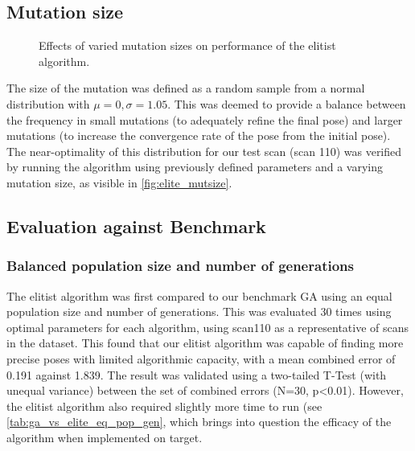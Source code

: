 \documentclass[authoryearcitations]{UoYCSproject}
\begin{document}
\subsection{Mutation size}

\datatableelitemutsize

\begin{figure}
	\centering
	\caption[Optimising mutation step size for the elitist selection algorithm.]{Effects of varied mutation sizes on performance of the elitist algorithm.}
	\label{fig:elite_mutsize}
\end{figure}

The size of the mutation was defined as a random sample from a normal distribution with $\mu=0, \sigma=1.05$. This was deemed to provide a balance between the frequency in small mutations (to adequately refine the final pose) and larger mutations (to increase the convergence rate of the pose from the initial pose). The near-optimality of this distribution for our test scan (scan 110) was verified by running the algorithm using previously defined parameters and a varying mutation size, as visible in \autoref{fig:elite_mutsize}.

\subsection{Evaluation against Benchmark}
\subsubsection{Balanced population size and number of generations}
\label{subsec:ga_vs_elite_eq_pop_gen}
The elitist algorithm was first compared to our benchmark GA using an equal population size and number of generations. This was evaluated 30 times using optimal parameters for each algorithm, using scan110 as a representative of scans in the dataset. This found that our elitist algorithm was capable of finding more precise poses with limited algorithmic capacity, with a mean combined error of 0.191 against 1.839. The result was validated using a two-tailed T-Test (with unequal variance) between the set of combined errors (N=30, p<0.01). However, the elitist algorithm also required slightly more time to run (see \autoref{tab:ga_vs_elite_eq_pop_gen}, which brings into question the efficacy of the algorithm when implemented on target.
\end{document}
